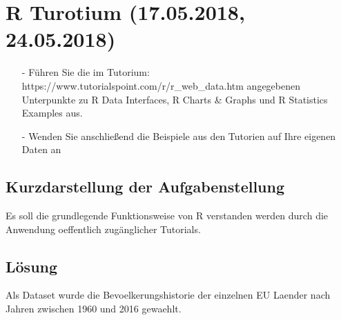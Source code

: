 \section{R Turotium (17.05.2018, 24.05.2018) }
\begin{itemize}
\item[-]Führen Sie die im Tutorium: https://www.tutorialspoint.com/r/r\_web\_data.htm angegebenen Unterpunkte zu R Data Interfaces, R Charts \& Graphs und R Statistics Examples aus.
\item[-]Wenden Sie anschließend die Beispiele aus den Tutorien auf Ihre eigenen Daten an
\end{itemize}

\subsection*{Kurzdarstellung der Aufgabenstellung}
Es soll die grundlegende Funktionsweise von R verstanden werden durch die Anwendung oeffentlich zugänglicher Tutorials.

\subsection*{Lösung}
Als Dataset wurde die Bevoelkerungshistorie der einzelnen EU Laender nach Jahren zwischen 1960 und 2016 gewaehlt. 

